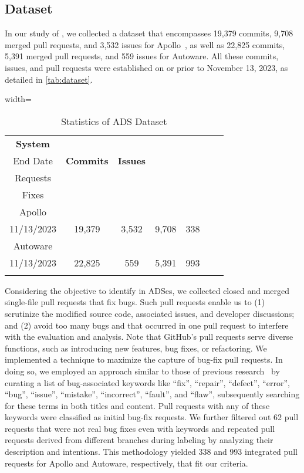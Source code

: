 \subsection{Dataset}

In our study of \bfps, we collected a dataset that encompasses 19,379 commits, 9,708 merged pull requests, and 3,532 issues for Apollo~\cite{apollo}, as well as 22,825 commits, 5,391 merged pull requests, and 559 issues for Autoware. 
All these commits, issues, and pull requests were established on or prior to November 13, 2023, as detailed in \autoref{tab:dataset}.

\begin{wraptable}[7]{r}{0.52\textwidth}
\vspace{-1ex}
\centering
\caption{Statistics of ADS Dataset}
\begin{adjustbox}{width=\linewidth}
\begin{tabular}{ccccccc}
\Xhline{3\arrayrulewidth}
    \textbf{System} & \textbf{\makecell{Start Date--\\End Date}} & \textbf{Commits} & \textbf{Issues} & \textbf{\makecell{Pull\\Requests}} & \textbf{\makecell{Bug\\Fixes}} \\
\hline
Apollo & \makecell{07/04/2017--\\11/13/2023} & 19,379 & 3,532 & 9,708 & 338 \\
\hline
Autoware & \makecell{08/25/2015--\\11/13/2023} & 22,825 & 559 & 5,391 & 993 \\
\Xhline{3\arrayrulewidth}
\end{tabular}
\end{adjustbox}
\label{tab:dataset}
\end{wraptable}

Considering the objective to identify \bfps in ADSes, we collected closed and merged single-file pull requests that fix bugs. Such pull requests enable us to 
(1) scrutinize the modified source code, associated issues, and developer discussions; 
and (2) avoid too many bugs and \bfps that occurred in one pull request to interfere with the evaluation and analysis. 
Note that GitHub's pull requests serve diverse functions, such as introducing new features, bug fixes, or refactoring. 
We implemented a technique to maximize the capture of bug-fix pull requests. In doing so, we employed an approach similar to those of previous research~\cite{GarciaF0AXC20,IslamNPR19,VasilescuYWDF15,ZhangCCXZ18} by curating a list of bug-associated keywords like ``fix'', ``repair'', ``defect'', ``error'', ``bug'', ``issue'', ``mistake'', ``incorrect'', ``fault'', and ``flaw'', subsequently searching for these terms in both titles and content.
Pull requests with any of these keywords were classified as initial bug-fix requests. We further filtered out 62 pull requests that were not real bug fixes even with keywords and repeated pull requests derived from different branches during labeling by analyzing their description and intentions.
This methodology yielded 338 and 993 integrated pull requests for Apollo and Autoware, respectively, that fit our criteria.
